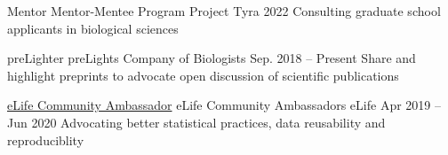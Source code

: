 

\begin{cventries}

  \cventry%
    {Mentor}%
    {Mentor-Mentee Program}%
    {Project Tyra}%
    {2022}%
    {Consulting graduate school applicants in biological sciences}
    
  \cventry%
    {preLighter}%
    {preLights}%
    {Company of Biologists}%
    {Sep. 2018 -- Present}%
    {Share and highlight preprints to advocate open discussion of scientific publications}

  \cventry%
    {\href{https://elifesciences.org/inside-elife/a946c355/elife-community-ambassadors-243-volunteers-join-the-programme-in-2019}{eLife Community Ambassador}}%
    {eLife Community Ambassadors}%
    {eLife}%
    {Apr 2019 -- Jun 2020}%
    {Advocating better statistical practices, data reusability and reproduciblity}

\end{cventries}
